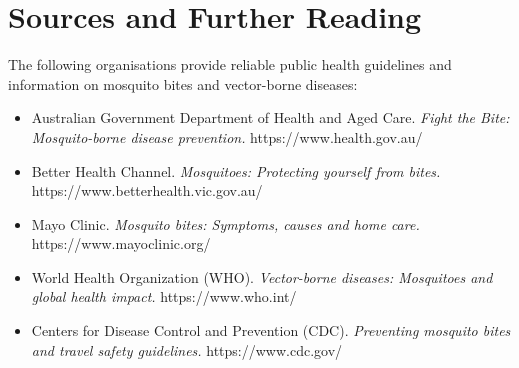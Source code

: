 \section*{Sources and Further Reading}
The following organisations provide reliable public health guidelines and information on mosquito bites and vector-borne diseases:
\begin{itemize}
    \item Australian Government Department of Health and Aged Care. \textit{Fight the Bite: Mosquito-borne disease prevention.} https://www.health.gov.au/
    \item Better Health Channel. \textit{Mosquitoes: Protecting yourself from bites.} https://www.betterhealth.vic.gov.au/
    \item Mayo Clinic. \textit{Mosquito bites: Symptoms, causes and home care.} https://www.mayoclinic.org/
    \item World Health Organization (WHO). \textit{Vector-borne diseases: Mosquitoes and global health impact.} https://www.who.int/
    \item Centers for Disease Control and Prevention (CDC). \textit{Preventing mosquito bites and travel safety guidelines.} https://www.cdc.gov/
\end{itemize}
